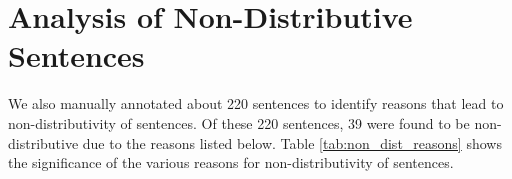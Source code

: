 \section{Analysis of Non-Distributive Sentences}

    We also manually annotated about 220 sentences to identify reasons that lead to non-distributivity of sentences. Of these 220 sentences, 39 were found to be non-distributive due to the reasons listed below. Table \ref{tab:non_dist_reasons} shows the significance of the various reasons for non-distributivity of sentences.

    \begin{table}[h]
        \centering
        \caption{Reasons for non-distributivity of sentences along with their significance based on the frequency of occurence}
        \label{tab:non_dist_reasons}
    \end{table}

